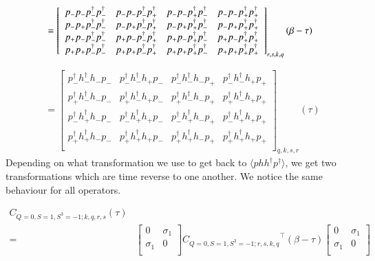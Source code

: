 \begin{equation*}
  \begin{aligned}
    &= \left[ 
    {\begin{array}{cccc}
      p_{-}p_{-}p^\dagger_{-}p^\dagger_{-} & p_{-}p_{-}p^\dagger_{-}p^\dagger_{+} & p_{-}p_{-}p^\dagger_{+}p^\dagger_{-} & p_{-}p_{-}p^\dagger_{+}p^\dagger_{+} \\
      p_{-}p_{+}p^\dagger_{-}p^\dagger_{-} & p_{-}p_{+}p^\dagger_{-}p^\dagger_{+} & p_{-}p_{+}p^\dagger_{+}p^\dagger_{-} & p_{-}p_{+}p^\dagger_{+}p^\dagger_{+} \\
      p_{+}p_{-}p^\dagger_{-}p^\dagger_{-} & p_{+}p_{-}p^\dagger_{-}p^\dagger_{+} & p_{+}p_{-}p^\dagger_{+}p^\dagger_{-} & p_{+}p_{-}p^\dagger_{+}p^\dagger_{+} \\
      p_{+}p_{+}p^\dagger_{-}p^\dagger_{-} & p_{+}p_{+}p^\dagger_{-}p^\dagger_{+} & p_{+}p_{+}p^\dagger_{+}p^\dagger_{-} & p_{+}p_{+}p^\dagger_{+}p^\dagger_{+} \\
    \end{array} } 
    \right]_{r,s,k,q} (\beta-\tau) \\
  \end{aligned}
\end{equation*}

\renewcommand{\dcor}[4]{p_{#2}^\dagger h_{#1}^\dagger h_{#4} p_{#3}}

\begin{equation*}
  \begin{aligned}
    &= \left[ {\begin{array}{cccc}
      \dcor{-}{-}{-}{-} & \dcor{-}{-}{-}{+} & \dcor{-}{-}{+}{-} & \dcor{-}{-}{+}{+} \\
      \dcor{-}{+}{-}{-} & \dcor{-}{+}{-}{+} & \dcor{-}{+}{+}{-} & \dcor{-}{+}{+}{+} \\
      \dcor{+}{-}{-}{-} & \dcor{+}{-}{-}{+} & \dcor{+}{-}{+}{-} & \dcor{+}{-}{+}{+} \\
      \dcor{+}{+}{-}{-} & \dcor{+}{+}{-}{+} & \dcor{+}{+}{+}{-} & \dcor{+}{+}{+}{+} \\
    \end{array} } \right]_{q,k,s,r} (\tau)
  \end{aligned}
\end{equation*}
Depending on what transformation we use to get back to $\langle phh^\dagger p^\dagger\rangle$, we get two transformations which are time reverse to one another. We notice the same behaviour for all operators.

\begin{equation*}
  \begin{aligned}
    C_{Q=0,S=1,S^3=-1;k,q,r,s} (\tau) \\
    =& \left[ {\begin{array}{cc}
      0 & \sigma_1 \\
      \sigma_1 & 0 \\
    \end{array} } \right]
    {C_{Q=0,S=1,S^3=-1;r,s,k,q}}^\top (\beta-\tau)
    \left[ {\begin{array}{cc}
      0 & \sigma_1 \\
      \sigma_1 & 0 \\
    \end{array} } \right]
  \end{aligned}
\end{equation*}

